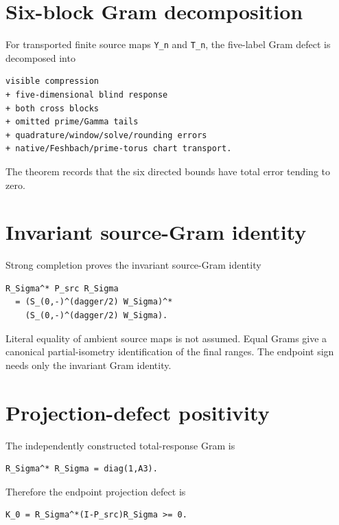 \hypertarget{six-block-gram-decomposition}{%
\section{Six-block Gram decomposition}\label{six-block-gram-decomposition}}

For transported finite source maps \texttt{Y\_n} and \texttt{T\_n}, the five-label Gram defect is decomposed into

\begin{verbatim}
visible compression
+ five-dimensional blind response
+ both cross blocks
+ omitted prime/Gamma tails
+ quadrature/window/solve/rounding errors
+ native/Feshbach/prime-torus chart transport.
\end{verbatim}

The theorem records that the six directed bounds have total error tending to zero.

\hypertarget{invariant-source-gram-identity}{%
\section{Invariant source-Gram identity}\label{invariant-source-gram-identity}}

Strong completion proves the invariant source-Gram identity

\begin{verbatim}
R_Sigma^* P_src R_Sigma
  = (S_(0,-)^(dagger/2) W_Sigma)^*
    (S_(0,-)^(dagger/2) W_Sigma).
\end{verbatim}

Literal equality of ambient source maps is not assumed. Equal Grams give a canonical partial-isometry identification of the final ranges. The endpoint sign needs only the invariant Gram identity.

\hypertarget{projection-defect-positivity}{%
\section{Projection-defect positivity}\label{projection-defect-positivity}}

The independently constructed total-response Gram is

\begin{verbatim}
R_Sigma^* R_Sigma = diag(1,A3).
\end{verbatim}

Therefore the endpoint projection defect is

\begin{verbatim}
K_0 = R_Sigma^*(I-P_src)R_Sigma >= 0.
\end{verbatim}

